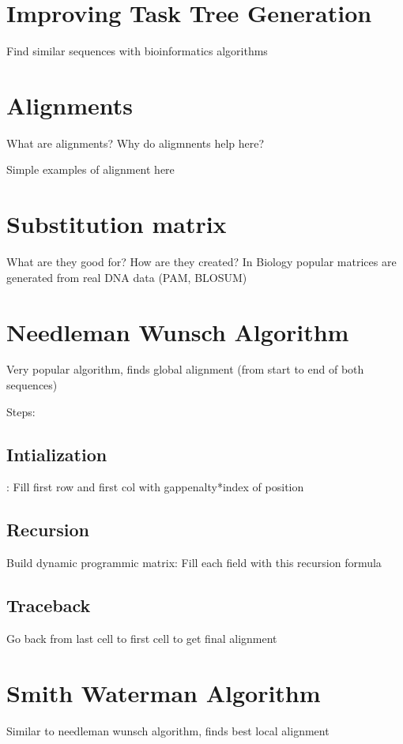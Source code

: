 \section{Improving Task Tree Generation}
Find similar sequences with bioinformatics algorithms

\section{Alignments}
What are alignments? Why do aligmnents help here?

Simple examples of alignment here

\section{Substitution matrix}
What are they good for? How are they created? In Biology popular matrices are generated from real DNA data (PAM, BLOSUM)



\section{Needleman Wunsch Algorithm}
Very popular algorithm, finds global alignment (from start to end of both sequences)

Steps:

\subsection{Intialization}:
Fill first row and first col with gappenalty*index of position

\subsection{Recursion}
Build dynamic programmic matrix: Fill each field with this recursion formula

\subsection{Traceback}
Go back from last cell to first cell to get final alignment



\section{Smith Waterman Algorithm}
Similar to needleman wunsch algorithm, finds best local alignment

